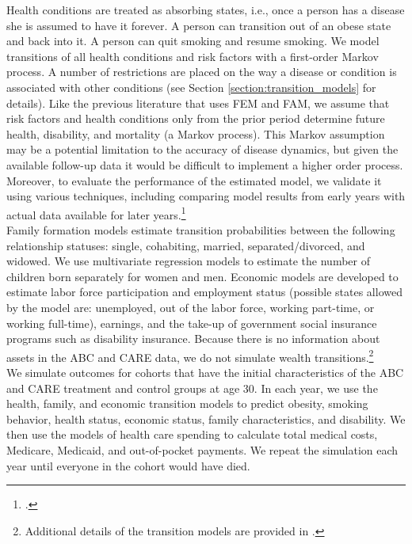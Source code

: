 \noindent Health conditions are treated as absorbing states, i.e., once a person has a disease she is assumed to have it forever. A person can transition out of an obese state and back into it.  A person can quit smoking and resume smoking. We model transitions of all health conditions and risk factors with a first-order Markov process. A number of restrictions are placed on the way a disease or condition is associated with other conditions (see Section \ref{section:transition_models} for details). Like the previous literature that uses FEM and FAM, we assume that risk factors and health conditions only from the prior period determine future health, disability, and mortality (a Markov process). This Markov assumption may be a potential limitation to the accuracy of disease dynamics, but given the available follow-up data it would be difficult to implement a higher order process. Moreover, to evaluate the performance of the estimated model, we validate it using various techniques, including comparing model results from early years with actual data available for later years.\footnote{\citet{Goldman_etal_2015_Future-America-Model}.} \\

\noindent Family formation models estimate transition probabilities between the following relationship statuses:  single, cohabiting, married, separated/divorced, and widowed. We use multivariate regression models to estimate the number of children born separately for women and men. Economic models are developed to estimate labor force participation and employment status (possible states allowed by the model are: unemployed, out of the labor force, working part-time, or working full-time), earnings, and the take-up of government social insurance programs such as disability insurance. Because there is no information about assets in the ABC and CARE data, we do not simulate wealth transitions.\footnote{Additional details of the transition models are provided in \citet{Goldman_etal_2015_Future-America-Model}.} \\

\noindent We simulate outcomes for cohorts that have the initial characteristics of the ABC and CARE treatment and control groups at age 30. In each year, we use the health, family, and economic transition models to predict obesity, smoking behavior, health status, economic status, family characteristics, and disability. We then use the models of health care spending to calculate total medical costs, Medicare, Medicaid, and out-of-pocket payments. We repeat the simulation each year until everyone in the cohort would have died. \\
